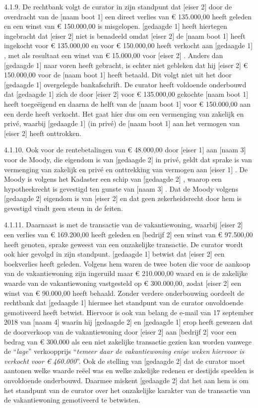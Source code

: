 \documentclass[
  dutch,
  a4paper,
]{article}
\begin{document}
4.1.9. De rechtbank volgt de curator in zijn standpunt dat {[}eiser 2{]} door de overdracht van de {[}naam boot 1{]} een direct verlies van € 135.000,00 heeft geleden en een winst van € 150.000,00 is misgelopen. {[}gedaagde 1{]} heeft hiertegen ingebracht dat {[}eiser 2{]} niet is benadeeld omdat {[}eiser 2{]} de {[}naam boot 1{]} heeft ingekocht voor € 135.000,00 en voor € 150.000,00 heeft verkocht aan {[}gedaagde 1{]} , met als resultaat een winst van € 15.000,00 voor {[}eiser 2{]} . Anders dan {[}gedaagde 1{]} naar voren heeft gebracht, is echter niet gebleken dat hij {[}eiser 2{]} € 150.000,00 voor de {[}naam boot 1{]} heeft betaald. Dit volgt niet uit het door {[}gedaagde 1{]} overgelegde bankafschrift. De curator heeft voldoende onderbouwd dat {[}gedaagde 1{]} zich de door {[}eiser 2{]} voor € 135.000,00 gekochte {[}naam boot 1{]} heeft toegeëigend en daarna de helft van de {[}naam boot 1{]} voor € 150.000,00 aan een derde heeft verkocht. Het gaat hier dus om een vermenging van zakelijk en privé, waarbij {[}gedaagde 1{]} (in privé) de {[}naam boot 1{]} aan het vermogen van {[}eiser 2{]} heeft onttrokken.

4.1.10. Ook voor de rentebetalingen van € 48.000,00 door {[}eiser 1{]} aan {[}naam 3{]} voor de Moody, die eigendom is van {[}gedaagde 2{]} in privé, geldt dat sprake is van vermenging van zakelijk en privé en onttrekking van vermogen aan {[}eiser 1{]} . De Moody is volgens het Kadaster een schip van {[}gedaagde 2{]} , waarop een hypotheekrecht is gevestigd ten gunste van {[}naam 3{]} . Dat de Moody volgens {[}gedaagde 2{]} eigendom is van {[}eiser 2{]} en dat geen zekerheidsrecht door hem is gevestigd vindt geen steun in de feiten.

4.1.11. Daarnaast is met de transactie van de vakantiewoning, waarbij {[}eiser 2{]} een verlies van € 169.200,00 heeft geleden en {[}bedrijf 2{]} een winst van € 97.500,00 heeft genoten, sprake geweest van een onzakelijke transactie. De curator wordt ook hier gevolgd in zijn standpunt. {[}gedaagde 1{]} betwist dat {[}eiser 2{]} een boekverlies heeft geleden. Volgens hem waren de twee boten die voor de aankoop van de vakantiewoning zijn ingeruild maar € 210.000,00 waard en is de zakelijke waarde van de vakantiewoning vastgesteld op € 300.000,00, zodat {[}eiser 2{]} een winst van € 90.000,00 heeft behaald. Zonder verdere onderbouwing oordeelt de rechtbank dat {[}gedaagde 1{]} hiermee het standpunt van de curator onvoldoende gemotiveerd heeft betwist. Hiervoor is ook van belang de e-mail van 17 september 2018 van {[}naam 4{]} waarin hij {[}gedaagde 2{]} en {[}gedaagde 1{]} erop heeft gewezen dat de doorverkoop van de vakantiewoning door {[}eiser 2{]} aan {[}bedrijf 2{]} voor een bedrag van € 300.000 als een niet zakelijke transactie gezien kan worden vanwege de ``\emph{lage}'' verkoopprijs ``\emph{temeer daar de vakantiewoning enige weken hiervoor is verkocht voor € 460.000}''. Ook de stelling van {[}gedaagde 2{]} dat de curator moet aantonen welke waarde reëel was en welke zakelijke redenen er destijds speelden is onvoldoende onderbouwd. Daarmee miskent {[}gedaagde 2{]} dat het aan hem is om het standpunt van de curator over het onzakelijke karakter van de transactie van de vakantiewoning gemotiveerd te betwisten.
\end{document}
